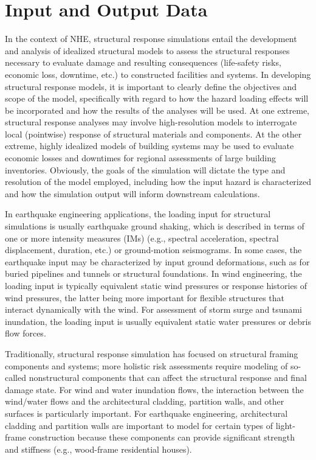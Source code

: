\section{Input and Output Data}
\label{sec:resp_struct_io}

In the context of NHE, structural response simulations entail the development and analysis of idealized structural models to assess the structural responses necessary to evaluate damage and resulting consequences (life-safety risks, economic loss, downtime, etc.) to constructed facilities and systems. In developing structural response models, it is important to clearly define the objectives and scope of the model, specifically with regard to how the hazard loading effects will be incorporated and how the results of the analyses will be used. At one extreme, structural response analyses may involve high-resolution models to interrogate local (pointwise) response of structural materials and components. At the other extreme, highly idealized models of building systems may be used to evaluate economic losses and downtimes for regional assessments of large building inventories. Obviously, the goals of the simulation will dictate the type and resolution of the model employed, including how the input hazard is characterized and how the simulation output will inform downstream calculations.

In earthquake engineering applications, the loading input for structural simulations is usually earthquake ground shaking, which is described in terms of one or more intensity measures (IMs) (e.g., spectral acceleration, spectral displacement, duration, etc.) or ground-motion seismograms. In some cases, the earthquake input may be characterized by input ground deformations, such as for buried pipelines and tunnels or structural foundations. In wind engineering, the loading input is typically equivalent static wind pressures or response histories of wind pressures, the latter being more important for flexible structures that interact dynamically with the wind. For assessment of storm surge and tsunami inundation, the loading input is usually equivalent static water pressures or debris flow forces. 

Traditionally, structural response simulation has focused on structural framing components and systems; more holistic risk assessments require modeling of so-called nonstructural components that can affect the structural response and final damage state. For wind and water inundation flows, the interaction between the wind/water flows and the architectural cladding, partition walls, and other surfaces is particularly important. For earthquake engineering, architectural cladding and partition walls are important to model for certain types of light-frame construction because these components can provide significant strength and stiffness (e.g., wood-frame residential houses).

